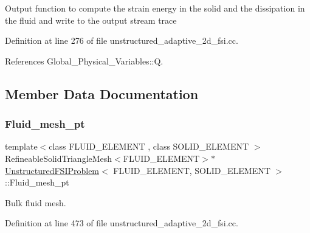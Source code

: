 Output function to compute the strain energy in the solid and the dissipation in the fluid and write to the output stream trace 

Definition at line 276 of file unstructured\+\_\+adaptive\+\_\+2d\+\_\+fsi.\+cc.



References Global\+\_\+\+Physical\+\_\+\+Variables\+::Q.



\subsection{Member Data Documentation}
\mbox{\label{classUnstructuredFSIProblem_a97363ac2b89dd5d37e969b30a4f14ad4}} 
\subsubsection{\texorpdfstring{Fluid\+\_\+mesh\+\_\+pt}{Fluid\_mesh\_pt}}
{\footnotesize\ttfamily template$<$class F\+L\+U\+I\+D\+\_\+\+E\+L\+E\+M\+E\+NT , class S\+O\+L\+I\+D\+\_\+\+E\+L\+E\+M\+E\+NT $>$ \\
Refineable\+Solid\+Triangle\+Mesh$<$F\+L\+U\+I\+D\+\_\+\+E\+L\+E\+M\+E\+NT$>$$\ast$ \hyperlink{classUnstructuredFSIProblem}{Unstructured\+F\+S\+I\+Problem}$<$ F\+L\+U\+I\+D\+\_\+\+E\+L\+E\+M\+E\+NT, S\+O\+L\+I\+D\+\_\+\+E\+L\+E\+M\+E\+NT $>$\+::Fluid\+\_\+mesh\+\_\+pt}



Bulk fluid mesh. 



Definition at line 473 of file unstructured\+\_\+adaptive\+\_\+2d\+\_\+fsi.\+cc.

\mbox{\label{classUnstructuredFSIProblem_adbe081be33298732323b23d89f23f29f}} 
